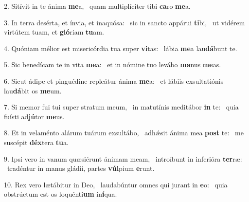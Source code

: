 2. Sitívit in te ánima \textbf{me}a, \ast\  quam multiplíciter tibi \textbf{ca}ro \textbf{me}a.\

3. In terra desérta, et ínvia, et inaquósa: \dag\  sic in sancto appárui \textbf{ti}bi, \ast\  ut vidérem virtútem tuam, et \textbf{gló}riam \textbf{tu}am.\

4. Quóniam mélior est misericórdia tua super \textbf{vi}tas: \ast\  lábia \textbf{me}a lau\textbf{dá}bunt te.\

5. Sic benedícam te in vita \textbf{me}a: \ast\  et in nómine tuo levábo \textbf{ma}nus \textbf{me}as.\

6. Sicut ádipe et pinguédine repleátur ánima \textbf{me}a: \ast\  et lábiis exsultatiónis lau\textbf{dá}bit os \textbf{me}um.\

7. Si memor fui tui super stratum meum, \dag\  in matutínis meditábor \textbf{in} te: \ast\  quia fuísti ad\textbf{jú}tor \textbf{me}us.\

8. Et in velaménto alárum tuárum exsultábo, \dag\  adhǽsit ánima mea \textbf{post} te: \ast\  me suscépit \textbf{déx}tera \textbf{tu}a.\

9. Ipsi vero in vanum quæsiérunt ánimam meam, \dag\  introíbunt in inferióra \textbf{ter}ræ: \ast\  tradéntur in manus gládii, partes \textbf{vúl}pium \textbf{e}runt.\

10. Rex vero lætábitur in Deo, \dag\  laudabúntur omnes qui jurant in \textbf{e}o: \ast\  quia obstrúctum est os loquénti\textbf{um} in\textbf{í}qua.\

